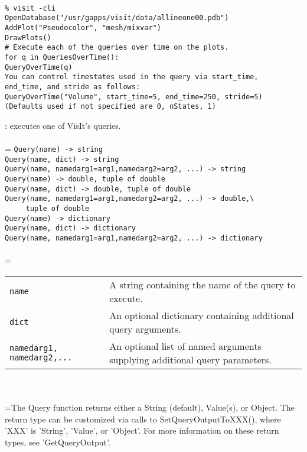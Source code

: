 \documentclass[10pt,a4paper]{report}
\begin{document}
\\[-6mm]
\begin{verbatim}% visit -cli
OpenDatabase("/usr/gapps/visit/data/allineone00.pdb")
AddPlot("Pseudocolor", "mesh/mixvar")
DrawPlots()
# Execute each of the queries over time on the plots.
for q in QueriesOverTime():
QueryOverTime(q)
You can control timestates used in the query via start_time,
end_time, and stride as follows:
QueryOverTime("Volume", start_time=5, end_time=250, stride=5)
(Defaults used if not specified are 0, nStates, 1)
\end{verbatim}
\newpage


{}
: executes one of VisIt's queries.\\[-3mm]

 \\ 
\hangindent=\parindent 
\verb!Query(name) -> string!\\ 
\verb!Query(name, dict) -> string!\\ 
\verb!Query(name, namedarg1=arg1,namedarg2=arg2, ...) -> string!\\ 
\verb!Query(name) -> double, tuple of double!\\ 
\verb!Query(name, dict) -> double, tuple of double!\\
\verb!Query(name, namedarg1=arg1,namedarg2=arg2, ...) -> double,\ ! \\ 
\verb!     tuple of double!\\ 
\verb!Query(name) -> dictionary!\\ 
\verb!Query(name, dict) -> dictionary!\\ 
\verb!Query(name, namedarg1=arg1,namedarg2=arg2, ...) -> dictionary!\\ [-3mm]

 \\ 
\hangindent=\parindent 
\begin{tabular}{lp{9cm}}
\verb!name! & A string containing the name of the query to execute. \\
\verb!dict! & An optional dictionary containing additional query arguments. \\
\verb!namedarg1, namedarg2,...! & An optional list of named arguments supplying additional query parameters. \\
\end{tabular} \\[-2mm]


 \\ 
\hangindent=\parindent The Query function returns either a String (default), Value(s), or Object. The return type can be customized via calls to SetQueryOutputToXXX(), where 'XXX' is 'String', 'Value', or 'Object'. For more information on these return types, see 'GetQueryOutput'. \\[-3mm] 
\end{document}
